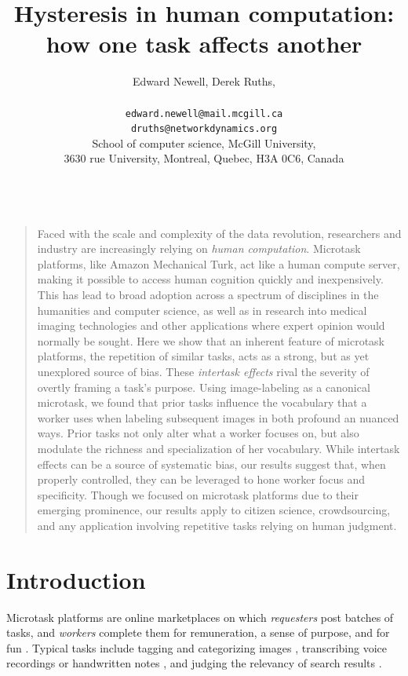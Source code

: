\documentclass[12pt]{article}
\title{Hysteresis in human computation:\\ how one task affects another}
\author
{Edward Newell, Derek Ruths,\\
\\
\normalsize{\texttt{edward.newell@mail.mcgill.ca}}\\
\normalsize{\texttt{druths@networkdynamics.org}}\\
\normalsize{School of computer science, McGill University,}\\
\normalsize{3630 rue University, Montreal, Quebec, H3A 0C6, Canada}\\
\\
}
\date{}
\newenvironment{sciabstract}{%
\begin{quote} \bf}
{\end{quote}}
\begin{document}
 


\baselineskip24pt


\maketitle 




\begin{sciabstract}

Faced with the scale and complexity of the data revolution, researchers and
industry are increasingly relying on \textit{human computation}.  Microtask
platforms, like Amazon Mechanical Turk, act like a human compute server,
making it possible to access human cognition quickly and inexpensively. 
This has lead to broad adoption across a spectrum of disciplines
in the humanities and computer science, as well as in research into medical 
imaging technologies and other applications where expert opinion would 
normally be sought.  Here we show that an inherent
feature of microtask platforms, the repetition of similar tasks,
acts as a strong, but as yet unexplored source of bias.  
These \textit{intertask effects} rival the
severity of overtly framing a task's purpose.  
Using image-labeling as a canonical microtask, we found that prior 
tasks influence the vocabulary that a worker uses when labeling 
subsequent images in both profound an nuanced ways.  Prior tasks not only 
alter what a worker focuses on, 
but also modulate the richness and specialization of her vocabulary.  
While intertask effects can be a source of systematic bias, our
results suggest that, when properly controlled, they can be leveraged
to hone worker focus and specificity.  Though we focused on microtask 
platforms due to their emerging prominence, our results apply to  
citizen science, crowdsourcing, and any application involving repetitive 
tasks relying on human judgment.
\end{sciabstract}

\section*{Introduction}
Microtask platforms are online marketplaces on which \textit{requesters} 
post batches of tasks, and \textit{workers} complete them
for remuneration, a sense of purpose, and for fun
\cite{kazai2013analysis,Antin20122925}.  
Typical tasks include tagging and categorizing images 
\cite{6116320,Zhai2012357}, transcribing voice recordings 
\cite{chandler2013breaking,paolacci2010running}
or handwritten notes \cite{Berinsky2012351,Finnerty2013}, and judging the 
relevancy of search results 
\cite{le2010ensuring,grady2010crowdsourcing,alonso2009can,kazai2013analysis}.
\end{document}
